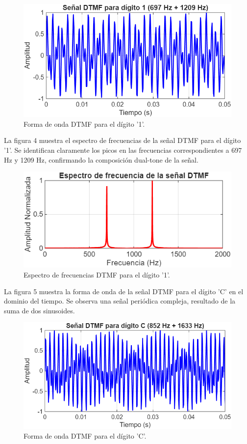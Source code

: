 \documentclass[journal]{IEEEtran} %
\begin{document}
\begin{figure}[H]
    \centerline{\includegraphics[width=0.8\columnwidth]{Figure_3.png}}
    \caption{Forma de onda DTMF para el dígito '1'.}
    \label{fig}
\end{figure}


La figura 4 muestra el espectro de frecuencias de la señal DTMF para el dígito '1'. Se identifican claramente los picos en las frecuencias correspondientes a 697 Hz y 1209 Hz, confirmando la composición dual-tone de la señal.
\begin{figure}[H]
    \centerline{\includegraphics[width=0.8\columnwidth]{Figure_4.png}}
    \caption{Espectro de frecuencias DTMF para el dígito '1'.}
    \label{fig}
\end{figure}


La figura 5 muestra la forma de onda de la señal DTMF para el dígito 'C' en el dominio del tiempo. Se observa una señal periódica compleja, resultado de la suma de dos sinusoides.
\begin{figure}[H]
    \centerline{\includegraphics[width=0.8\columnwidth]{Figure_5.png}}
    \caption{Forma de onda DTMF para el dígito 'C'.}
    \label{fig}
\end{figure}
\end{document}
